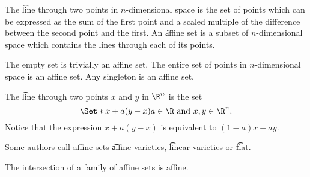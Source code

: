 


The \t{line through} two points in $n$-dimensional space is the set of points which can be expressed as the sum of the first point and a scaled multiple of the difference between the second point and the first.
An \t{affine set} is a subset of $n$-dimensional space which contains the lines through each of its points.


The empty set is trivially an affine set.
The entire set of points in $n$-dimensional space is an affine set.
Any singleton is an affine set.


The \t{line through} two points $x$ and $y$ in $\R^n$ is the set
$$
  \Set*{x + a(y - x)}{a \in \R \text{ and } x, y \in \R^n}.
$$
Notice that the expression $x + a(y - x)$ is equivalent to $(1 - a)x + ay$.


Some authors call affine sets \t{affine varieties}, \t{linear varieties} or \t{flat}.

\begin{prop}
  The intersection of a family of affine sets is affine.
\end{prop}
